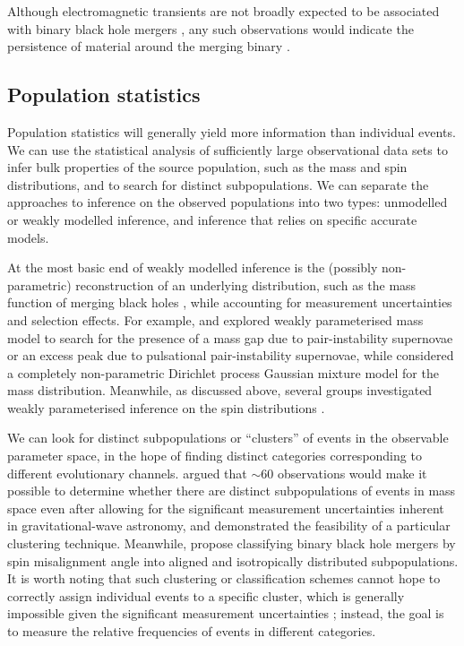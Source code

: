 \documentclass[review]{elsarticle}
\begin{document}
Although electromagnetic transients are not broadly expected to be associated with binary black hole mergers \citep[e.g.,][]{Lyutikov:2016}, any such observations would indicate the persistence of material around the merging binary \citep[e.g.,][]{deMinkKing:2017}.

\subsection{Population statistics}

Population statistics will generally yield more information than individual events.  We can use the statistical analysis of sufficiently large observational data sets to infer bulk properties of the source population, such as the mass and spin distributions, and to search for distinct subpopulations.  We can separate the approaches to inference on the observed populations into two types: unmodelled or weakly modelled inference, and inference that relies on specific accurate models. 

At the most basic end of weakly modelled inference is the (possibly non-parametric) reconstruction of an underlying distribution, such as the mass function of merging black holes \citep{BBH:O1,GWTC2:pop,GWTC3:pop}, while accounting for measurement uncertainties and selection effects.  For example, \citet{Fishbach:2017mass} and \citet{Edelman:2021} explored weakly parameterised mass model to search for the presence of a mass gap due to pair-instability supernovae or an excess peak due to pulsational pair-instability supernovae, while \citet{RinaldiDelPozzo:2021} considered a completely non-parametric Dirichlet process Gaussian mixture model for the mass distribution.  Meanwhile, as discussed above, several groups investigated weakly parameterised inference on the spin distributions \citep[e.g.,][]{TalbotThrane:2017,GWTC2:pop,Callister:2021,Galaudage:2021}.  

We can look for distinct subpopulations or ``clusters'' of events in the observable parameter space, in the hope of finding distinct categories corresponding to different evolutionary channels.  \citet{Mandel:2015} argued that $\sim 60$ observations would make it possible to determine whether there are distinct subpopulations of events in mass space even after allowing for the significant measurement uncertainties inherent in gravitational-wave astronomy, and \citet{Mandel:2016cluster} demonstrated the feasibility of a particular clustering technique.  Meanwhile, \citet{Farr:2018} propose classifying binary black hole mergers by spin misalignment angle into aligned and isotropically distributed subpopulations.  It is worth noting that such clustering or classification schemes cannot hope to correctly assign individual events to a specific cluster, which is generally impossible given the significant measurement uncertainties \citep{Littenberg:2015}; instead, the goal is to measure the relative frequencies of events in different categories.
\end{document}
